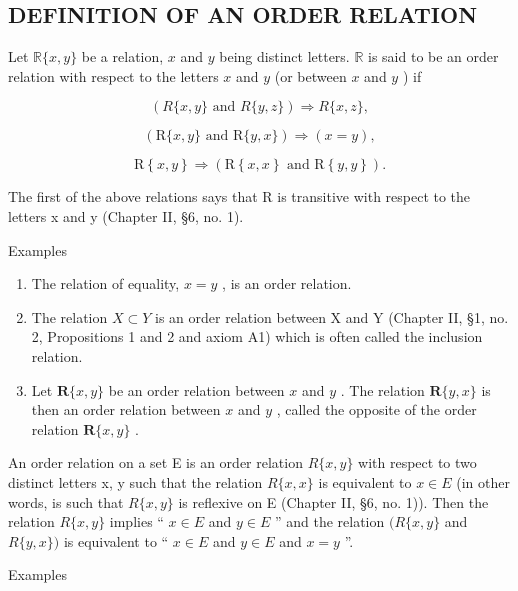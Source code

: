 \subsection{DEFINITION OF AN ORDER RELATION}

Let \(\mathbb{R}\{x, y\}\) be a relation, \(x\) and \(y\) being distinct letters. \(\mathbb{R}\) is said to be an order relation with respect to the letters \(x\) and \(y\) (or between \(x\) and \(y\) ) if

\[
(R \{x, y \} \text {   and   } R \{y, z \}) \Longrightarrow R \{x, z \},
\]

\[
(\mathrm{R} \{x, y \} \text {   and   } \mathrm{R} \{y, x \}) \Longrightarrow (x = y),
\]

\[
\mathrm{R} \left\{x, y \right\} \Longrightarrow (\mathrm{R} \left\{x, x \right\} \text { and } \mathrm{R} \left\{y, y \right\}).
\]

The first of the above relations says that R is transitive with respect to the letters x and y (Chapter II, §6, no. 1).

Examples

\begin{enumerate}
\def\labelenumi{(\arabic{enumi})}
\item
  The relation of equality, \(x = y\) , is an order relation.
\item
  The relation \(X \subset Y\) is an order relation between X and Y (Chapter II, §1, no. 2, Propositions 1 and 2 and axiom A1) which is often called the inclusion relation.
\item
  Let \(\mathbf{R}\{x, y\}\) be an order relation between \(x\) and \(y\) . The relation \(\mathbf{R}\{y, x\}\) is then an order relation between \(x\) and \(y\) , called the opposite of the order relation \(\mathbf{R}\{x, y\}\) .
\end{enumerate}

An order relation on a set E is an order relation \(R\{x, y\}\) with respect to two distinct letters x, y such that the relation \(R\{x, x\}\) is equivalent to \(x \in E\) (in other words, is such that \(R\{x, y\}\) is reflexive on E (Chapter II, §6, no. 1)). Then the relation \(R\{x, y\}\) implies `` \(x \in E\) and \(y \in E\) '' and the relation \((R\{x, y\}\) and \(R\{y, x\})\) is equivalent to `` \(x \in E\) and \(y \in E\) and \(x = y\) ''.

Examples

